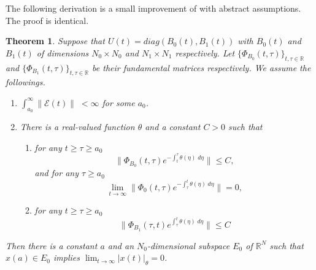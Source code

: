 \documentclass[a4paper,11pt]{article}
\newcommand{\E}{\mathcal{E}}
\newcounter{Theorem}
\newtheorem{theorem}[Theorem]{Theorem}
\theoremstyle{remark}
\begin{document}
The following derivation is a small improvement of \cite[Theorem 1]{L19} with abstract assumptions. The proof is identical.
\begin{theorem} \label{result0} Suppose that $U(t) = diag(B_0(t),B_1(t))$ with $B_0(t)$ and $B_1(t)$ of dimensions $N_0\times N_0$ and $N_1 \times N_1$ respectively. Let $\{\Phi_{B_0}(t,\tau)\}_{t,\tau \in \mathbb{R}}$ and $\{\Phi_{B_1}(t,\tau)\}_{t,\tau \in \mathbb{R}}$ be their fundamental matrices respectively. We assume the followings.
\begin{enumerate}
\item $\int_{a_0}^\infty \|\E(t)\| \; < \infty$ for some $a_0$.
\item There is a real-valued function $\theta$ and a constant $C>0$ such that
\begin{enumerate}
\item for any $t\ge \tau \ge a_0$
$$\|\Phi_{B_0}(t,\tau) e^{-\int_{t}^{\tau} \theta(\eta)\; d\eta}\| \le C,$$
and for any $\tau \ge a_0$ \begin{equation}\label{eq:decay} \lim_{t \rightarrow \infty}\|\Phi_0(t,\tau)e^{-\int_{\tau}^t \theta(\eta)\;d\eta}\| = 0,\end{equation}
\item for any $t\ge \tau \ge a_0$
$$\|\Phi_{B_1}(\tau,t) e^{\int_{\tau}^{t} \theta(\eta)\; d\eta}\| \le C$$
\end{enumerate}
\end{enumerate}
Then there is a constant $a$ and an $N_0$-dimensional subspace $E_0$ of $ \mathbb{R}^N$ such that $x(a)\in E_0$ implies $\displaystyle \lim_{t \rightarrow \infty}|x(t)|_\theta =0$. %
\end{theorem}
\end{document}
